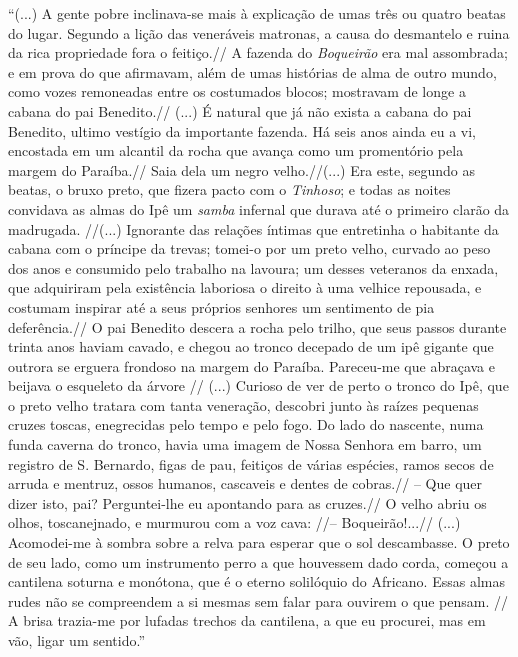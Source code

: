 ``(...) A gente pobre inclinava-se mais à explicação de umas três ou
quatro beatas do lugar. Segundo a lição das veneráveis matronas, a causa
do desmantelo e ruina da rica propriedade fora o feitiço.// A fazenda do
\emph{Boqueirão} era mal assombrada; e em prova do que afirmavam, além
de umas histórias de alma de outro mundo, como vozes remoneadas entre os
costumados blocos; mostravam de longe a cabana do pai Benedito.// (...)
É natural que já não exista a cabana do pai Benedito, ultimo vestígio da
importante fazenda. Há seis anos ainda eu a vi, encostada em um alcantil
da rocha que avança como um promentório pela margem do Paraíba.// Saia
dela um negro velho.//(...) Era este, segundo as beatas, o bruxo preto,
que fizera pacto com o \emph{Tinhoso}; e todas as noites convidava as
almas do Ipê um \emph{samba} infernal que durava até o primeiro clarão
da madrugada. //(...) Ignorante das relações íntimas que entretinha o
habitante da cabana com o príncipe da trevas; tomei-o por um preto
velho, curvado ao peso dos anos e consumido pelo trabalho na lavoura; um
desses veteranos da enxada, que adquiriram pela existência laboriosa o
direito à uma velhice repousada, e costumam inspirar até a seus próprios
senhores um sentimento de pia deferência.// O pai Benedito descera a
rocha pelo trilho, que seus passos durante trinta anos haviam cavado, e
chegou ao tronco decepado de um ipê gigante que outrora se erguera
frondoso na margem do Paraíba. Pareceu-me que abraçava e beijava o
esqueleto da árvore // (...) Curioso de ver de perto o tronco do Ipê,
que o preto velho tratara com tanta veneração, descobri junto às raízes
pequenas cruzes toscas, enegrecidas pelo tempo e pelo fogo. Do lado do
nascente, numa funda caverna do tronco, havia uma imagem de Nossa
Senhora em barro, um registro de S. Bernardo, figas de pau, feitiços de
várias espécies, ramos secos de arruda e mentruz, ossos humanos,
cascaveis e dentes de cobras.// -- Que quer dizer isto, pai?
Perguntei-lhe eu apontando para as cruzes.// O velho abriu os olhos,
toscanejnado, e murmurou com a voz cava: //-- Boqueirão!...// (...)
Acomodei-me à sombra sobre a relva para esperar que o sol descambasse. O
preto de seu lado, como um instrumento perro a que houvessem dado corda,
começou a cantilena soturna e monótona, que é o eterno solilóquio do
Africano. Essas almas rudes não se compreendem a si mesmas sem falar
para ouvirem o que pensam. // A brisa trazia-me por lufadas trechos da
cantilena, a que eu procurei, mas em vão, ligar um sentido.''

